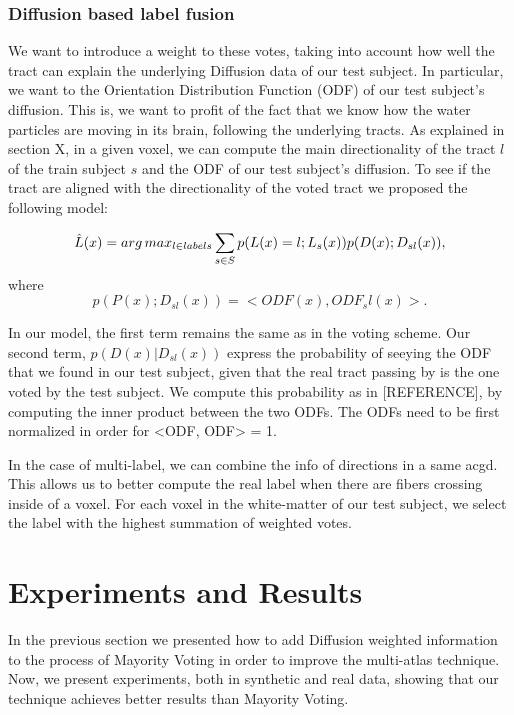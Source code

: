 \subsubsection{Diffusion based label fusion}
We want to introduce a weight to these votes, taking into account how well the
tract can explain the underlying Diffusion data of our test subject. In
particular, we want to the Orientation Distribution Function (ODF) of our
test subject's diffusion. This is, we want to profit of the fact that we know
how the water particles are moving in its brain, following the underlying tracts.
As explained in section X, in a given voxel, we can compute the main
directionality of the tract $l$ of the train subject $s$ and the ODF of our
test subject's diffusion. To see if the tract are aligned with the
directionality of the voted tract we proposed the following model:

\begin{equation}
\label{eq:argmax}
\hat L(x) = arg\,max_{l \in labels} \sum_{s\in S} p(L(x) = l ; L_s(x)) p(D(x) ; D_{sl}(x)),
\end{equation}
where
\begin{equation}
\label{eq:peaks}
p(P(x) ; D_{sl}(x)) = <ODF(x), ODF_sl(x)>.
\end{equation}

In our model, the first term remains the same as in the voting scheme.
Our second term, $p(D(x) | D_{sl}(x))$ express the probability
of seeying the ODF that we found in our test subject, given that the real
tract passing by is the one voted by the test subject. We compute this
probability as in [REFERENCE], by computing the inner product between the
two ODFs. The ODFs need to be first normalized in order for <ODF, ODF> = 1.

In the case of multi-label, we can combine the info of directions in a same acgd.
This allows us to better compute the real label when there are fibers crossing
inside of a voxel.
For each voxel in the white-matter of our test subject, we select the label
with the highest summation of weighted votes. 

\section{Experiments and Results}

In the previous section we presented how to add Diffusion weighted information
to the process of Mayority Voting in order to improve the multi-atlas technique.
Now, we present experiments, both in synthetic and real data, showing that
our technique achieves better results than Mayority Voting.

